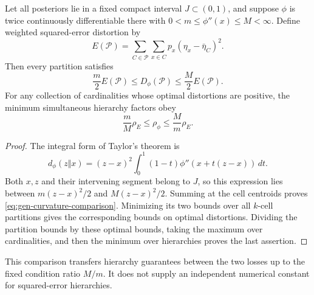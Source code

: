 \begin{proposition}
\label{prop:gen-curvature}
Let all posteriors lie in a fixed compact interval
$J\subset(0,1)$, and suppose $\phi$ is twice continuously
differentiable there with
$0<m\le\phi''(x)\le M<\infty$. Define weighted squared-error
distortion by
\[
 E(\mathcal P)=\sum_{C\in\mathcal P}
                  \sum_{x\in C}p_x(\eta_x-\bar\eta_C)^2.
\]
Then every partition satisfies
\begin{equation}
 \frac m2 E(\mathcal P)\le D_\phi(\mathcal P)
                         \le\frac M2 E(\mathcal P).
 \label{eq:gen-curvature-comparison}
\end{equation}
For any collection of cardinalities whose optimal distortions
are positive, the minimum simultaneous hierarchy factors obey
\[
 \frac mM\rho_E\le\rho_\phi\le\frac Mm\rho_E.
\]
\end{proposition}

\begin{proof}
The integral form of Taylor's theorem is
\[
 d_\phi(z\Vert x)
 =(z-x)^2\int_0^1(1-t)\phi''(x+t(z-x))\,dt.
\]
Both $x,z$ and their intervening segment belong to $J$, so this
expression lies between $m(z-x)^2/2$ and $M(z-x)^2/2$.
Summing at the cell centroids proves
\eqref{eq:gen-curvature-comparison}. Minimizing its two bounds
over all $k$-cell partitions gives the corresponding bounds on
optimal distortions. Dividing the partition bounds by these
optimal bounds, taking the maximum over cardinalities, and then
the minimum over hierarchies proves the last assertion.
\end{proof}

This comparison transfers hierarchy guarantees between the two
losses up to the fixed condition ratio $M/m$. It does not supply
an independent numerical constant for squared-error hierarchies.
